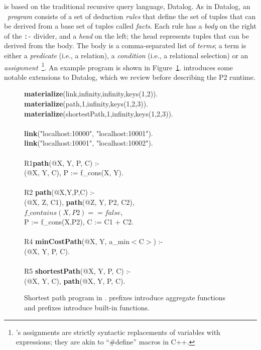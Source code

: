 \OVERLOG is based on the traditional recursive query language, Datalog.  As in
Datalog, an \OVERLOG~{\em program} consists of a set of deduction {\em rules}
that define the set of tuples that can be derived from a base set of tuples
called {\em facts}.  Each rule has a {\em body} on the right of the \texttt{:-}
divider, and a {\em head} on the left; the head represents tuples that can be
derived from the body.  The body is a comma-separated list of {\em terms}; a
term is either a {\em predicate} (i.e., a relation), a {\em condition} (i.e., a
relational selection) or an {\em assignment}~\footnote{\OVERLOG's assignments
are strictly syntactic replacements of variables with expressions; they are
akin to ``\#define'' macros in C++.}.  An example \OVERLOG program is shown in
Figure~\ref{ch:p2:fig:overlogSP}.  \OVERLOG introduces some notable extensions
to Datalog, which we review before describing the P2 runtime.

\begin{figure}
\ssp
\begin{boxedminipage}{\linewidth}
{\bf materialize}(link,infinity,infinity,keys(1,2)). \\
{\bf materialize}(path,1,infinity,keys(1,2,3)).  \\
{\bf materialize}(shortestPath,1,infinity,keys(1,2,3)). \\
\\
{\bf link}("localhost:10000", "localhost:10001"). \\
{\bf link}("localhost:10001", "localhost:10002"). \\
\\
R1{\bf path}(@X, Y, P, C) :- \\
(@X, Y, C), P := f\_cons(X, Y). \\
\\       
R2 {\bf path}(@X,Y,P,C) :- \\
(@X, Z, C1), {\bf path}(@Z, Y, P2, C2), \\
\datalogspace $f\_contains(X,P2) == false$, \\
\datalogspace P := f\_cons(X,P2), C := C1 + C2. \\ 
\\      
R4 {\bf minCostPath}(@X, Y, a\_min$<$C$>$) :-  \\
(@X, Y, P, C). \\
\\
R5 {\bf shortestPath}(@X, Y, P, C) :- \\
(@X, Y, C), {\bf path}(@X, Y, P, C).\\
\end{boxedminipage}
\caption{\label{ch:p2:fig:overlogSP}Shortest path program in \OVERLOG. 
prefixes introduce aggregate functions and  prefixes introduce
built-in functions.}
\end{figure}

